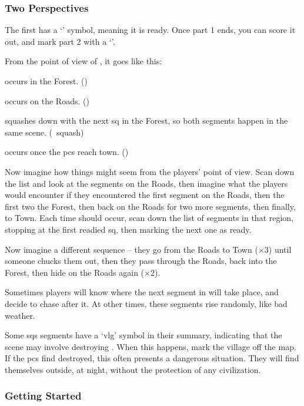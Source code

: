 \begin{multicols}{2}
\subsubsection{Two Perspectives}

The first has a `\sqr' symbol, meaning it is ready.
Once part 1 ends, you can score it out, and mark part 2 with a `\sqr'.

From the point of view of , it goes like this:

\begin{list}{\scshape Part }{}
  \item
  occurs in the Forest. (\sqr)
  \item
  occurs on the Roads. (\sqn)
  \item
  squashes down with the next \gls{sq} in the Forest, so both \glspl{segment} happen in the same scene. (\sqn~\gls{squash})
  \item
  occurs once the \glspl{pc} reach town. (\sqn)
\end{list}


Now imagine how things might seem from the players' point of view.
Scan down the list  and look at the \glspl{segment} on the Roads, then imagine what the players would encounter if they encountered the first \gls{segment} on the Roads, then the first two the Forest, then back on the Roads for two more \glspl{segment}, then finally, to Town.
Each time  should occur, scan down the list of \glspl{segment} in that region, stopping at the first readied \gls{sq}, then marking the next one as ready.

Now imagine a different sequence -- they go from the Roads to Town ($\times 3$) until someone chucks them out, then they pass through the Roads, back into the Forest, then hide on the Roads again ($\times 2$).

Sometimes players will know where the next \gls{segment} in  will take place, and decide to chase after it.
At other times, these \glspl{segment} rise randomly, like bad weather.

Some \glspl{sq} \glspl{segment} have a `\gls{vlg}' symbol in their summary, indicating that the scene may involve destroying .
When this happens, mark the \gls{village} off the map.
If the \glspl{pc} find  destroyed, this often presents a dangerous situation.
They will find themselves outside, at night, without the protection of any civilization.

\subsubsection{Getting Started}


\end{multicols}
